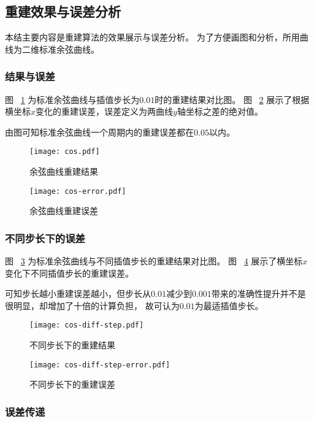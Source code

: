 \subsection{重建效果与误差分析}

本结主要内容是重建算法的效果展示与误差分析。
为了方便画图和分析，所用曲线为二维标准余弦曲线。

\subsubsection{结果与误差}

图 ~\ref{fig:cos} 为标准余弦曲线与插值步长为$0.01$时的重建结果对比图。
图 ~\ref{fig:cos-error} 展示了根据横坐标$x$变化的重建误差，误差定义为两曲线$y$轴坐标之差的绝对值。

由图可知标准余弦曲线一个周期内的重建误差都在$0.05$以内。


\begin{figure}
\centering
\texttt{[image: cos.pdf]}
\caption{余弦曲线重建结果}
\label{fig:cos}
\end{figure}

\begin{figure}
\centering
\texttt{[image: cos-error.pdf]}
\caption{余弦曲线重建误差}
\label{fig:cos-error}
\end{figure}

\subsubsection{不同步长下的误差}

图 ~\ref{fig:cos-diff-step} 为标准余弦曲线与不同插值步长的重建结果对比图。
图 ~\ref{fig:cos-diff-step-error} 展示了横坐标$x$变化下不同插值步长的重建误差。

可知步长越小重建误差越小，但步长从$0.01$减少到$0.001$带来的准确性提升并不是很明显，却增加了十倍的计算负担，
故可认为$0.01$为最适插值步长。

\begin{figure}
\centering
\texttt{[image: cos-diff-step.pdf]}
\caption{不同步长下的重建结果}
\label{fig:cos-diff-step}
\end{figure}

\begin{figure}
\centering
\texttt{[image: cos-diff-step-error.pdf]}
\caption{不同步长下的重建误差}
\label{fig:cos-diff-step-error}
\end{figure}

\subsubsection{误差传递}

